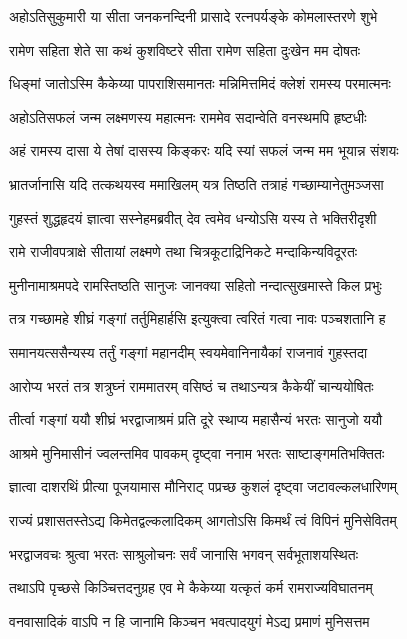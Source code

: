 \twolineshloka
{अहोऽतिसुकुमारी या सीता जनकनन्दिनी}
{प्रासादे रत्नपर्यङ्के कोमलास्तरणे शुभे} %

\twolineshloka
{रामेण सहिता शेते सा कथं कुशविष्टरे}
{सीता रामेण सहिता दुःखेन मम दोषतः} %

\twolineshloka
{धिङ्मां जातोऽस्मि कैकेय्या पापराशिसमानतः}
{मन्निमित्तमिदं क्लेशं रामस्य परमात्मनः} %

\twolineshloka
{अहोऽतिसफलं जन्म लक्ष्मणस्य महात्मनः}
{राममेव सदान्वेति वनस्थमपि हृष्टधीः} %

\twolineshloka
{अहं रामस्य दासा ये तेषां दासस्य किङ्करः}
{यदि स्यां सफलं जन्म मम भूयान्न संशयः} %

\twolineshloka
{भ्रातर्जानासि यदि तत्कथयस्व ममाखिलम्}
{यत्र तिष्ठति तत्राहं गच्छाम्यानेतुमञ्जसा} %

\twolineshloka
{गुहस्तं शुद्धहृदयं ज्ञात्वा सस्नेहमब्रवीत्}
{देव त्वमेव धन्योऽसि यस्य ते भक्तिरीदृशी} %

\twolineshloka
{रामे राजीवपत्राक्षे सीतायां लक्ष्मणे तथा}
{चित्रकूटाद्रिनिकटे मन्दाकिन्यविदूरतः} %

\twolineshloka
{मुनीनामाश्रमपदे रामस्तिष्ठति सानुजः}
{जानक्या सहितो नन्दात्सुखमास्ते किल प्रभुः} %

\twolineshloka
{तत्र गच्छामहे शीघ्रं गङ्गां तर्तुमिहार्हसि}
{इत्युक्त्वा त्वरितं गत्वा नावः पञ्चशतानि ह} %

\twolineshloka
{समानयत्ससैन्यस्य तर्तुं गङ्गां महानदीम्}
{स्वयमेवानिनायैकां राजनावं गुहस्तदा} %

\twolineshloka
{आरोप्य भरतं तत्र शत्रुघ्नं राममातरम्}
{वसिष्ठं च तथाऽन्यत्र कैकेयीं चान्ययोषितः} %

\twolineshloka
{तीर्त्वा गङ्गां ययौ शीघ्रं भरद्वाजाश्रमं प्रति}
{दूरे स्थाप्य महासैन्यं भरतः सानुजो ययौ} %

\twolineshloka
{आश्रमे मुनिमासीनं ज्वलन्तमिव पावकम्}
{दृष्ट्वा ननाम भरतः साष्टाङ्गमतिभक्तितः} %

\twolineshloka
{ज्ञात्वा दाशरथिं प्रीत्या पूजयामास मौनिराट्}
{पप्रच्छ कुशलं दृष्ट्वा जटावल्कलधारिणम्} %

\twolineshloka
{राज्यं प्रशासतस्तेऽद्य किमेतद्वल्कलादिकम्}
{आगतोऽसि किमर्थं त्वं विपिनं मुनिसेवितम्} %

\twolineshloka
{भरद्वाजवचः श्रुत्वा भरतः साश्रुलोचनः}
{सर्वं जानासि भगवन् सर्वभूताशयस्थितः} %

\twolineshloka
{तथाऽपि पृच्छसे किञ्चित्तदनुग्रह एव मे}
{कैकेय्या यत्कृतं कर्म रामराज्यविघातनम्} %

\twolineshloka
{वनवासादिकं वाऽपि न हि जानामि किञ्चन}
{भवत्पादयुगं मेऽद्य प्रमाणं मुनिसत्तम} %

